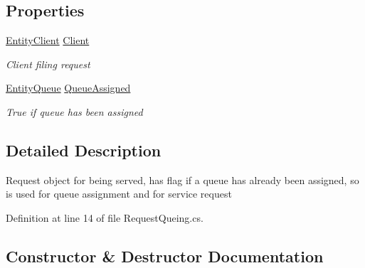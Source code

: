 \subsection*{Properties}
\begin{DoxyCompactItemize}
\item 
\hyperlink{class_simple_queue_example_1_1_model_elements_1_1_entity_client}{Entity\+Client} \hyperlink{class_simple_queue_example_1_1_model_elements_1_1_request_queing_aba7e64ed82d04bf0943a7c961d366543}{Client}
\begin{DoxyCompactList}\small\item\em Client filing request \end{DoxyCompactList}\item 
\hyperlink{class_simple_queue_example_1_1_model_elements_1_1_entity_queue}{Entity\+Queue} \hyperlink{class_simple_queue_example_1_1_model_elements_1_1_request_queing_acc9831be47a23fdd6a05f68552fa1517}{Queue\+Assigned}
\begin{DoxyCompactList}\small\item\em True if queue has been assigned \end{DoxyCompactList}\end{DoxyCompactItemize}


\subsection{Detailed Description}
Request object for being served, has flag if a queue has already been assigned, so is used for queue assignment and for service request 



Definition at line 14 of file Request\+Queing.\+cs.



\subsection{Constructor \& Destructor Documentation}
